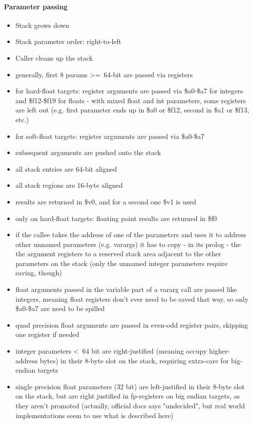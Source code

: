 \paragraph{Parameter passing}

\begin{itemize}
\item Stack grows down
\item Stack parameter order: right-to-left
\item Caller cleans up the stack
\item generally, first 8 params \textgreater=\ 64-bit are passed via registers
\item for hard-float targets: register arguments are passed via \$a0-\$a7 for integers and \$f12-\$f19 for floats - with mixed float and int parameters, some registers are left out (e.g. first parameter ends up in \$a0 or \$f12, second in \$a1 or \$f13, etc.)
\item for soft-float targets: register arguments are passed via \$a0-\$a7
\item subsequent arguments are pushed onto the stack
\item all stack entries are 64-bit aligned
\item all stack regions are 16-byte aligned
\item results are returned in \$v0, and for a second one \$v1 is used
\item only on hard-float targets: floating point results are returned in \$f0
\item if the callee takes the address of one of the parameters and uses it to address other unnamed parameters (e.g. varargs) it has to copy - in its prolog - the the argument registers to a reserved stack area adjacent to the other parameters on the stack (only the unnamed integer parameters require saving, though) %
\item float arguments passed in the variable part of a vararg call are passed like integers, meaning float registers don't ever need to be saved that way, so only \$a0-\$a7 are need to be spilled
\item quad precision float arguments are passed in even-odd register pairs, skipping one register if needed
\item integer parameters \textless\ 64 bit are right-justified (meaning occupy higher-address bytes) in their 8-byte slot on the stack, requiring extra-care for big-endian targets
\item single precision float parameters (32 bit) are left-justified in their 8-byte slot on the stack, but are right justified in fp-registers on big endian targets, as they aren't promoted (actually, official docs says "undecided", but real world implementations seem to use what is described here)
\end{itemize}

